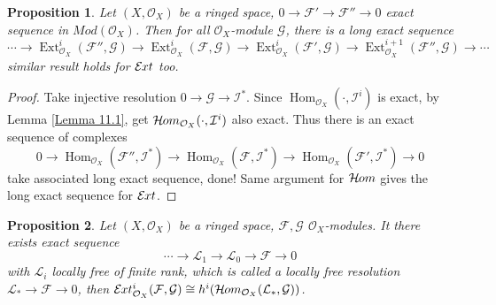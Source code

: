 \documentclass{ctexart}
\newtheorem{proposition}{Proposition}[section]
\renewcommand{\hom}{\operatorname{Hom}}
\newcommand{\ext}{\operatorname{Ext}}
\newcommand{\sheafhom}{\mathcal{H}\kern -.5pt om}
\newcommand{\sheafext}{\mathcal{E}\kern -.5pt xt}
\begin{document}
\begin{proposition}
    Let $(X, \mathcal{O}_{X})$ be a ringed space, $0 \longrightarrow \mathcal{F}' \longrightarrow \mathcal{F}'' \longrightarrow 0$ exact sequence in $Mod(\mathcal{O}_{X})$.
    Then for all $\mathcal{O}_{X}$-module $\mathcal{G}$, there is a long exact sequence
    \begin{equation*}
        \cdots \longrightarrow \ext_{\mathcal{O}_{X}}^{i}(\mathcal{F}'', \mathcal{G}) \longrightarrow \ext_{\mathcal{O}_{X}}^{i}(\mathcal{F}, \mathcal{G}) \longrightarrow \ext_{\mathcal{O}_{X}}^{i}(\mathcal{F}', \mathcal{G}) \longrightarrow \ext_{\mathcal{O}_{X}}^{i + 1}(\mathcal{F}'', \mathcal{G}) \longrightarrow \cdots
    \end{equation*}
    similar result holds for $\sheafext$ too.
    \label{Proposition 11.2}
\end{proposition}
\begin{proof}
    Take injective resolution $0 \longrightarrow \mathcal{G} \longrightarrow \mathcal{I}^{\ast}$.
    Since $\hom_{\mathcal{O}_{X}}(\cdot, \mathcal{I}^{i})$ is exact, by Lemma \ref{Lemma 11.1}, get $\sheafhom_{\mathcal{O}_{X}}(\cdot, \mathcal{I}^{i})$ also exact.
    Thus there is an exact sequence of complexes
    \begin{equation*}
        0 \longrightarrow \hom_{\mathcal{O}_{X}}(\mathcal{F}'', \mathcal{I}^{\ast}) \longrightarrow \hom_{\mathcal{O}_{X}}(\mathcal{F}, \mathcal{I}^{\ast}) \longrightarrow \hom_{\mathcal{O}_{X}}(\mathcal{F}', \mathcal{I}^{\ast}) \longrightarrow 0
    \end{equation*}
    take associated long exact sequence, done!
    Same argument for $\sheafhom$ gives the long exact sequence for $\sheafext$.
\end{proof}
\begin{proposition}
    Let $(X, \mathcal{O}_{X})$ be a ringed space, $\mathcal{F}, \mathcal{G}$ $\mathcal{O}_{X}$-modules.
    It there exists exact sequence
    \begin{equation*}
        \cdots \longrightarrow \mathcal{L}_{1} \longrightarrow \mathcal{L}_{0} \longrightarrow \mathcal{F} \longrightarrow 0
    \end{equation*}
    with $\mathcal{L}_{i}$ locally free of finite rank, 
    which is called a locally free resolution $\mathcal{L}_{\ast} \longrightarrow \mathcal{F} \longrightarrow 0$,
    then $\sheafext_{\mathcal{O}_{X}}^{i}(\mathcal{F}, \mathcal{G}) \cong h^{i}(\sheafhom_{\mathcal{O}_{X}}(\mathcal{L}_{\ast}, \mathcal{G}))$.
    \label{Proposition 11.3}
\end{proposition}
\end{document}
